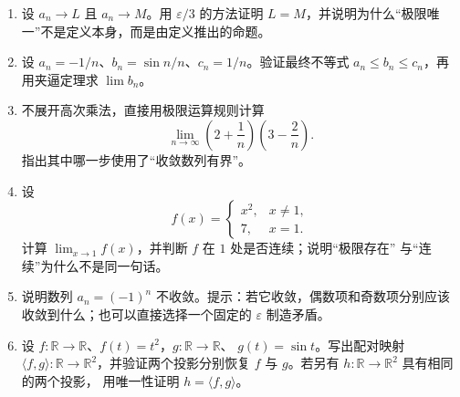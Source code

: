 \documentclass[UTF8,fontset=none,a4paper,11pt]{ctexart}
\theoremstyle{foundation-definition}
\theoremstyle{foundation-theorem}
\theoremstyle{foundation-proposition}
\theoremstyle{foundation-example}
\theoremstyle{foundation-remark}
\theoremstyle{foundation-theorem}
\begin{document}
\begin{enumerate}[label=M0.\arabic*.]
    再对 \(g:[0,\infty)\to[0,\infty)\)、\(g(x)=x^2\)，写出其唯一的左逆和右逆。
  \item 设 \(a_n\to L\) 且 \(a_n\to M\)。用 \(\varepsilon/3\) 的方法证明
    \(L=M\)，并说明为什么“极限唯一”不是定义本身，而是由定义推出的命题。
  \item 设 \(a_n=-1/n\)、\(b_n=\sin n/n\)、\(c_n=1/n\)。验证最终不等式
    \(a_n\le b_n\le c_n\)，再用夹逼定理求 \(\lim b_n\)。
  \item 不展开高次乘法，直接用极限运算规则计算
    \[
    \lim_{n\to\infty}\left(2+\frac1n\right)\left(3-\frac2n\right).
    \]
    指出其中哪一步使用了“收敛数列有界”。
  \item 设
    \[
    f(x)=\begin{cases}x^2,&x\ne1,\\ 7,&x=1.\end{cases}
    \]
    计算 \(\lim_{x\to1}f(x)\)，并判断 \(f\) 在 \(1\) 处是否连续；说明“极限存在”
    与“连续”为什么不是同一句话。
  \item 说明数列 \(a_n=(-1)^n\) 不收敛。提示：若它收敛，偶数项和奇数项分别应该
    收敛到什么；也可以直接选择一个固定的 \(\varepsilon\) 制造矛盾。
  \item 设 \(f:\mathbb R\to\mathbb R\)、\(f(t)=t^2\)，\(g:\mathbb R\to\mathbb R\)、
    \(g(t)=\sin t\)。写出配对映射
    \(\langle f,g\rangle:\mathbb R\to\mathbb R^2\)，并验证两个投影分别恢复
    \(f\) 与 \(g\)。若另有 \(h:\mathbb R\to\mathbb R^2\) 具有相同的两个投影，
    用唯一性证明 \(h=\langle f,g\rangle\)。
\end{enumerate}
\end{document}
